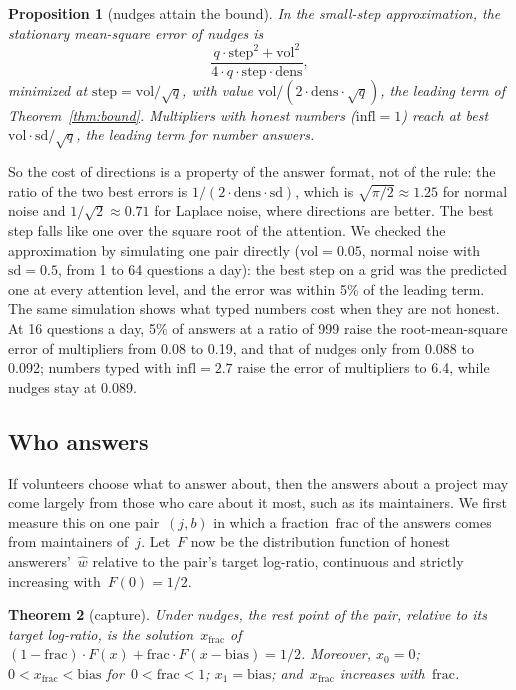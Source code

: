\documentclass[doubleblind]{ecai}
\newtheorem{theorem}{Theorem}
\newtheorem{proposition}[theorem]{Proposition}
\theoremstyle{remark}
\newcommand{\step}{\mathrm{step}}
\newcommand{\vol}{\mathrm{vol}}
\newcommand{\dens}{\mathrm{dens}}
\newcommand{\sd}{\mathrm{sd}}
\newcommand{\infl}{\mathrm{infl}}
\newcommand{\bias}{\mathrm{bias}}
\newcommand{\frc}{\mathrm{frac}}
\begin{document}
\begin{proposition}[nudges attain the bound]\label{prop:track}
In the small-step approximation, the stationary mean-square error of nudges is
\[
\frac{q\cdot\step^2 + \vol^2}{4\cdot q\cdot \step\cdot\dens},
\]
minimized at $\step = \vol/\sqrt{q}$, with value $\vol/(2\cdot\dens\cdot\sqrt q)$, the leading term of Theorem~\ref{thm:bound}. Multipliers with honest numbers ($\infl = 1$) reach at best $\vol\cdot\sd/\sqrt q$, the leading term for number answers.
\end{proposition}

So the cost of directions is a property of the answer format, not of the rule: the ratio of the two best errors is $1/(2\cdot\dens\cdot\sd)$, which is $\sqrt{\pi/2}\approx 1.25$ for normal noise and $1/\sqrt 2\approx 0.71$ for Laplace noise, where directions are better. The best step falls like one over the square root of the attention. We checked the approximation by simulating one pair directly ($\vol = 0.05$, normal noise with~$\sd = 0.5$, from 1 to 64 questions a day): the best step on a grid was the predicted one at every attention level, and the error was within 5\% of the leading term. The same simulation shows what typed numbers cost when they are not honest. At 16 questions a day, 5\% of answers at a ratio of 999 raise the root-mean-square error of multipliers from 0.08 to 0.19, and that of nudges only from 0.088 to 0.092; numbers typed with $\infl = 2.7$ raise the error of multipliers to 6.4, while nudges stay at 0.089.

\subsection{Who answers}\label{sec:who}

If volunteers choose what to answer about, then the answers about a project may come largely from those who care about it most, such as its maintainers. We first measure this on one pair~$(j,b)$ in which a fraction~$\frc$ of the answers comes from maintainers of~$j$. Let~$F$ now be the distribution function of honest answerers'~$\hat w$ relative to the pair's target log-ratio, continuous and strictly increasing with~$F(0) = 1/2$.

\begin{theorem}[capture]\label{thm:capture}
Under nudges, the rest point of the pair, relative to its target log-ratio, is the solution~$x_{\frc}$ of $(1-\frc)\cdot F(x) + \frc\cdot F(x-\bias) = 1/2$. Moreover, $x_0 = 0$; $0 < x_{\frc} < \bias$ for~$0<\frc<1$; $x_1 = \bias$; and~$x_{\frc}$ increases with~$\frc$.
\end{theorem}
\end{document}

